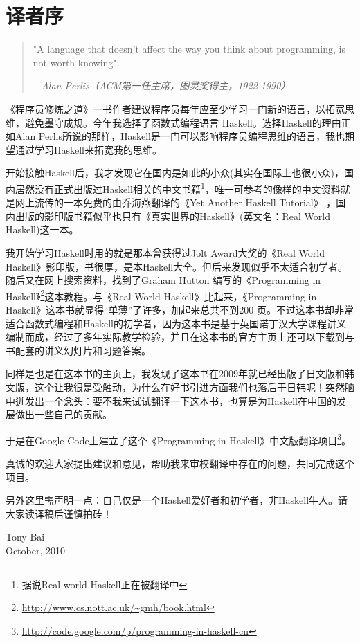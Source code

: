 
\chapter*{译者序}

\begin{quotation}
"A language that doesn't affect the way you think about programming, is not worth knowing".
\begin{flushright}
\textit{-- Alan Perlis（ACM第一任主席，图灵奖得主，1922-1990）}
\end{flushright}
\end{quotation}

《程序员修炼之道》一书作者建议程序员每年应至少学习一门新的语言，以拓宽思维，避免墨守成规。今年我选择了函数式编程语言
Haskell。选择Haskell的理由正如Alan
Perlis所说的那样，Haskell是一门可以影响程序员编程思维的语言，我也期望通过学习Haskell来拓宽我的思维。

开始接触Haskell后，我才发现它在国内是如此的小众(其实在国际上也很小众)，国内居然没有正式出版过Haskell相关的中文书籍\footnote{据说Real
world Haskell正在被翻译中}，唯一可参考的像样的中文资料就是网上流传的一本免费的由乔海燕翻译的《Yet
Another Haskell Tutorial》
，国内出版的影印版书籍似乎也只有《真实世界的Haskell》(英文名：Real World
Haskell)这一本。

我开始学习Haskell时用的就是那本曾获得过Jolt Award大奖的《Real World
Haskell》影印版，书很厚，是本Haskell大全。但后来发现似乎不太适合初学者。随后又在网上搜索资料，找到了Graham
Hutton 编写的《Programming in
Haskell》\footnote{\url{http://www.cs.nott.ac.uk/~gmh/book.html}}这本教程。与《Real World
Haskell》比起来，《Programming in
Haskell》这本书就显得“单薄”了许多，加起来总共不到200
页。不过这本书却非常适合函数式编程和Haskell的初学者，因为这本书是基于英国诺丁汉大学课程讲义编制而成，经过了多年实际教学检验，并且在这本书的官方主页上还可以下载到与书配套的讲义幻灯片和习题答案。

同样是也是在这本书的主页上，我发现了这本书在2009年就已经出版了日文版和韩文版，这个让我很是受触动，为什么在好书引进方面我们也落后于日韩呢！突然脑中迸发出一个念头：要不我来试试翻译一下这本书，也算是为Haskell在中国的发展做出一些自己的贡献。

于是在Google Code上建立了这个《Programming in Haskell》中文版翻译项目\footnote{\url{http://code.google.com/p/programming-in-haskell-cn}}。

真诚的欢迎大家提出建议和意见，帮助我来审校翻译中存在的问题，共同完成这个项目。

另外这里需声明一点：自己仅是一个Haskell爱好者和初学者，非Haskell牛人。请大家读译稿后谨慎拍砖！

\hspace*{12cm} Tony Bai\\
\hspace*{12cm} October, 2010
